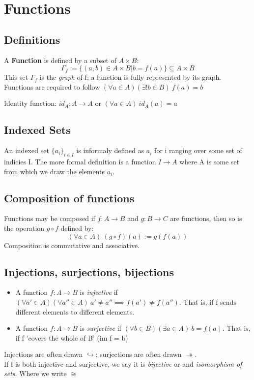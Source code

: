 \section{Functions}
\subsection{Definitions}
\begin{definition}
  A \textbf{Function} is defined by a subset of $A \times B$: 
  \[\Gamma_f := \{ (a, b) \in A \times B | b = f(a)\} \subseteq A \times B \]
  This set $\Gamma_f$ is the \textit{graph} of f; a function is fully represented by its graph.
  \\
  Functions are required to follow $(\forall a \in A)(\exists !b \in B) \: f(a) = b$
\end{definition}
Identity function: $id_A : A \to A$ or $(\forall a \in A) \: id_A(a) = a$ 


\subsection{Indexed Sets}
An indexed set $\{a_i \}_{i \in I}$ is informaly defined as $a_i$ for i ranging over some set of indicies I. The more formal definition is a function $I \to A$ where A is some set from which we draw the elements $a_i$.


\subsection{Composition of functions}
Functions may be composed if $f : A \to B$ and $g : B \to C$ are functions, then so is the operation $g \circ f$ defined by:
\[ (\forall a \in A) \: (g \circ f)(a) := g(f(a)) \]
Composition is commutative and associative.


\subsection{Injections, surjections, bijections}
\begin{itemize}
  \item A function $f: A \to B$ is \textit{injective} if $(\forall a' \in A)(\forall a'' \in A) \: a' \neq a'' \implies f(a') \neq f(a'')$. That is, if f sends different elements to different elements.
  \item A function $f: A \to B$ is \textit{surjective} if $(\forall b \in B)(\exists a \in A) \: b = f(a)$. That is, if f 'covers the whole of B' (im f = b)
\end{itemize}
Injections are often drawn $\hookrightarrow$; surjections are often drawn $\twoheadrightarrow$.
\\
If f is both injective and surjective, we say it is \textit{bijective} or and \textit{isomorphism of sets}. Where we write $\cong$


